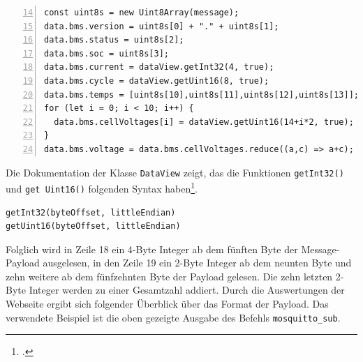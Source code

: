 \begin{lstlisting}[numbers=left,xleftmargin=\dimexpr2.5em-1pt,framexleftmargin=2em,firstnumber=14,label={lst:bms-reverse},caption=Inhalt der Webpack Datei \texttt{bmsReceivers.ts}]
const uint8s = new Uint8Array(message);
data.bms.version = uint8s[0] + "." + uint8s[1];
data.bms.status = uint8s[2];
data.bms.soc = uint8s[3];
data.bms.current = dataView.getInt32(4, true);
data.bms.cycle = dataView.getUint16(8, true);
data.bms.temps = [uint8s[10],uint8s[11],uint8s[12],uint8s[13]];
for (let i = 0; i < 10; i++) {
  data.bms.cellVoltages[i] = dataView.getUint16(14+i*2, true);
}
data.bms.voltage = data.bms.cellVoltages.reduce((a,c) => a+c);
\end{lstlisting}

\noindent Die Dokumentation der Klasse \texttt{DataView} zeigt, das die Funktionen \texttt{get\allowbreak Int32()} und \texttt{get\- Uint16()}
folgenden Syntax haben\footcite{dataview}.

\begin{lstlisting}
getInt32(byteOffset, littleEndian)
getUint16(byteOffset, littleEndian)
\end{lstlisting}

Folglich wird in Zeile \num{18} ein \num{4}-Byte Integer ab dem fünften Byte der Message-Payload ausgelesen, in den Zeile
\num{19} ein \num{2}-Byte Integer ab dem neunten Byte und zehn weitere ab dem fünfzehnten Byte der Payload gelesen.
Die zehn letzten \num{2}-Byte Integer werden zu einer Gesamtzahl addiert.
Durch die Auswertungen der Webseite ergibt sich folgender Überblick über das Format der Payload.
Das verwendete Beispiel ist die oben gezeigte Ausgabe des Befehls \texttt{mosquitto\_\allowbreak sub}.

